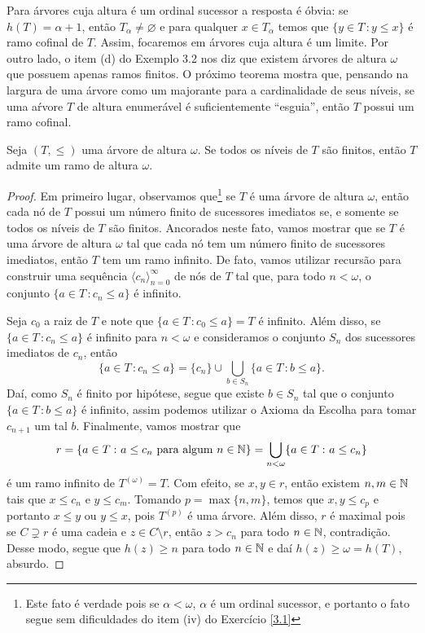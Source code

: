 \documentclass[a4paper]{article}
\begin{document}
  Para árvores cuja altura é um ordinal sucessor a resposta é óbvia: se \(h(T)=\alpha +1\),
  então \(T_\alpha\neq\varnothing\) e para qualquer \(x\in T_\alpha\) temos que
  \(\{y\in T \,\colon y\leq x\}\) é ramo cofinal de \(T\). Assim, focaremos em
  árvores cuja altura é um limite. Por outro lado, o item (d) do Exemplo 3.2 nos diz que
  existem árvores de altura \(\omega\) que possuem apenas ramos finitos. O
  próximo teorema mostra que,  pensando na largura de uma árvore como um
  majorante para a cardinalidade de seus níveis, se uma aŕvore \(T\) de altura
  enumerável é suficientemente ``esguia'', então \(T\) possui um ramo cofinal.

  \begin{teo}
  Seja \((T,\leq)\) uma árvore de altura \(\omega\). Se todos os níveis de \(T\) são finitos, então
  \(T\) admite um ramo de altura \(\omega\).
  \end{teo}
\begin{proof}
  Em primeiro lugar, observamos que\footnote{Este fato é verdade pois se $\alpha < \omega$, $\alpha$ é um ordinal sucessor, 
  e portanto o fato segue sem dificuldades do item (iv) do Exercício \ref{3.1}} se  \(T\) é uma árvore de altura \(\omega\), então cada nó de \(T\) possui
  um número finito de sucessores imediatos se, e somente se todos os níveis de
  \(T\) são finitos. Ancorados neste fato, vamos mostrar que se \(T\) é uma
  árvore de altura \(\omega\) tal que cada nó tem um número finito de sucessores
  imediatos,  então \(T\) tem um ramo infinito. De fato, vamos utilizar recursão
  para  construir uma sequência \(\langle c_n\rangle_{n=0}^{\infty}\)  de nós de
  \(T\) tal que, para todo \(n<\omega\), o conjunto \(\{a\in T\,\colon c_n\leq a\}\) é
  infinito.

  Seja \(c_0\) a raiz de \(T\) e  note que \(\{a \in T\,\colon c_{0} \leq a \}= T\)
  é infinito. Além disso, se \(\{a\in T\,\colon c_n\leq a\}\) é infinito para
  \(n<\omega\) e consideramos  o
  conjunto \(S_n\) dos sucessores imediatos de \(c_n\), então
  \[
  \{a\in T\,\colon c_n\leq a\} = \{c_n\} \cup\bigcup_{b\in S_n} \{a\in T\,\colon b\leq a\}.
  \]
 Daí, como \(S_n\) é finito por hipótese, segue que existe \(b\in S_n\) tal que
 o conjunto \(\{a\in T\,\colon b\leq a\}\) é infinito, assim podemos utilizar o
 Axioma da Escolha para tomar \(c_{n+1}\) um tal \(b\). 
 Finalmente, vamos mostrar que
  \[r=\{a\in T\,\colon a\leq c_n \text{ para algum }
    n\in\mathbb{N}\}=\bigcup_{n <\omega}\{a\in T\,\colon a\leq c_n\}\]
  é um ramo infinito de \(T^{(\omega)}=T\).
  Com efeito, se \(x,y\in r\), então existem \(n,m\in\mathbb{N}\) tais que
  \(x\leq c_n\) e \(y\leq c_m\).
  Tomando \(p=\max\{n,m\}\), temos que \(x,y\leq c_p\) e portanto  \(x\leq y\) ou
  \(y\leq x\),  pois \(T^{(p)}\) é uma árvore. Além disso, \(r\) é maximal pois se
  \(C\supsetneq r\) é uma  cadeia e \(z\in C\setminus r\), então \(z>c_n\)
  para todo \(n\in\mathbb{N}\), contradição. Desse modo, segue que \(h(z)\geq n\)
  para todo \(n\in\mathbb{N}\) e daí \(h(z)\geq\omega=h(T)\), absurdo.
  \end{proof}
\end{document}
